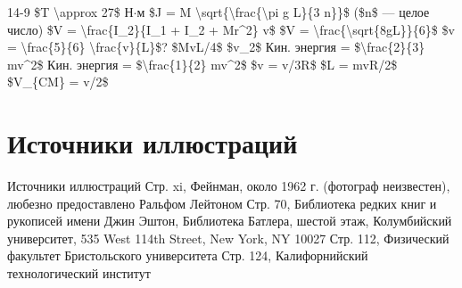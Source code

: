 \documentclass[10pt,oneside]{article}
\begin{document}
14-9 \$T \textbackslash{}approx 27\$ Н\ensuremath{\cdot}м \$J = M \textbackslash{}sqrt\{\textbackslash{}frac\{\textbackslash{}pi g L\}\{3 n\}\}\$ (\$n\$ --- целое число) \$V = \textbackslash{}frac\{I\_2\}\{I\_1 + I\_2 + Mr\textasciicircum{}2\} v\$ \$V = \textbackslash{}frac\{\textbackslash{}sqrt\{8gL\}\}\{6\}\$ \$v = \textbackslash{}frac\{5\}\{6\} \textbackslash{}frac\{v\}\{L\}\$? \$MvL/4\$ \$v\_2\$ Кин. энергия = \$\textbackslash{}frac\{2\}\{3\} mv\textasciicircum{}2\$ Кин. энергия = \$\textbackslash{}frac\{1\}\{2\} mv\textasciicircum{}2\$ \$v = v/3R\$ \$L = mvR/2\$ \$V\_\{CM\} = v/2\$\par

\clearpage
{}
\section*{Источники иллюстраций}
\label{tips-sec-14-источники-иллюстраций}
Источники иллюстраций Стр. xi, Фейнман, около 1962 г. (фотограф неизвестен), любезно предоставлено Ральфом Лейтоном Стр. 70, Библиотека редких книг и рукописей имени Джин Эштон, Библиотека Батлера, шестой этаж, Колумбийский университет, 535 West 114th Street, New York, NY 10027 Стр. 112, Физический факультет Бристольского университета Стр. 124, Калифорнийский технологический институт\par

\clearpage
{}
\end{document}
